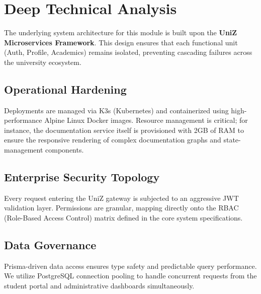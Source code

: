 \section{Deep Technical Analysis}
The underlying system architecture for this module is built upon the \textbf{UniZ Microservices Framework}. 
This design ensures that each functional unit (Auth, Profile, Academics) remains isolated, preventing cascading failures across the university ecosystem.

\subsection{Operational Hardening}
Deployments are managed via K3s (Kubernetes) and containerized using high-performance Alpine Linux Docker images. 
Resource management is critical; for instance, the documentation service itself is provisioned with 2GB of RAM to ensure the responsive rendering of complex documentation graphs and state-management components.

\subsection{Enterprise Security Topology}
Every request entering the UniZ gateway is subjected to an aggressive JWT validation layer. 
Permissions are granular, mapping directly onto the RBAC (Role-Based Access Control) matrix defined in the core system specifications.

\subsection{Data Governance}
Prisma-driven data access ensures type safety and predictable query performance. 
We utilize PostgreSQL connection pooling to handle concurrent requests from the student portal and administrative dashboards simultaneously.
